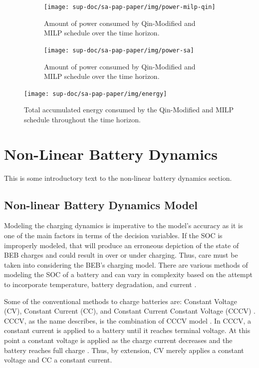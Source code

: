 \documentclass[ee,thesis]{usuthesis}
\begin{document}
\begin{figure}
  \begin{subfigure}[t]{\textwidth}
    \centering
    \texttt{[image: sup-doc/sa-pap-paper/img/power-milp-qin]}
    \caption{Amount of power consumed by Qin-Modified and MILP schedule over the time horizon.}
    \label{fig:power-usage-milp-qin}
  \end{subfigure}

  \hfill

  \begin{subfigure}[t]{\textwidth}
    \centering
    \texttt{[image: sup-doc/sa-pap-paper/img/power-sa]}
    \caption{Amount of power consumed by Qin-Modified and MILP schedule over the time horizon.}
    \label{fig:power-usage-sa}
  \end{subfigure}
  \caption{}
  \label{fig:power}
\end{figure}

\begin{figure}[htpb]
\centering \texttt{[image: sup-doc/sa-pap-paper/img/energy]}
    \caption{Total accumulated energy consumed by the Qin-Modified and MILP schedule throughout the time horizon.}
    \label{fig:energy-usage}
\end{figure}

\chapter{Non-Linear Battery Dynamics}
\label{sec:nonlinear-battery-dynamics}
This is some introductory text to the non-linear battery dynamics section.

\section{Non-linear Battery Dynamics Model}
\label{sec:model}
Modeling the charging dynamics is imperative to the model's accuracy as it is one of the main factors in terms of the
decision variables. If the SOC is improperly modeled, that will produce an erroneous depiction of the state of BEB
charges and could result in over or under charging. Thus, care must be taken into considering the BEB's charging model.
There are various methods of modeling the SOC of a battery and can vary in complexity based on the attempt to
incorporate temperature, battery degradation, and current
\cite{zhang-2021-optim-elect,chen-2008-desig-grey,watrin-2012-multip-lithium}.

Some of the conventional methods to charge batteries are: Constant Voltage (CV), Constant Current (CC), and Constant
Current Constant Voltage (CCCV) \cite{arabsalmanabadi-2018-charg-techn}. CCCV, as the name describes, is the
combination of CCCV model \cite{abdollahi-2016-optim-batter,chen-2008-desig-grey,wang-2021-resear-optim}. In CCCV,
a constant current is applied to a battery until it reaches terminal voltage. At this point a constant voltage is
applied as the charge current decreases and the battery reaches full charge \cite{chen-2008-desig-grey}. Thus, by
extension, CV merely applies a constant voltage and CC a constant current.
\end{document}
